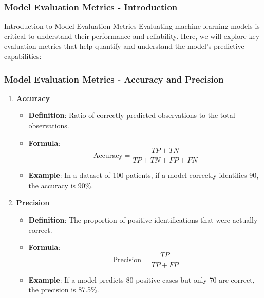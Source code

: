 \documentclass[aspectratio=169]{beamer}
\begin{document}
\begin{frame}[fragile]
    \frametitle{Model Evaluation Metrics - Introduction}
    \begin{block}{Introduction to Model Evaluation Metrics}
        Evaluating machine learning models is critical to understand their performance and reliability. 
        Here, we will explore key evaluation metrics that help quantify and understand the model's predictive capabilities:
    \end{block}
\end{frame}

\begin{frame}[fragile]
    \frametitle{Model Evaluation Metrics - Accuracy and Precision}
    \begin{enumerate}
        \item \textbf{Accuracy}
        \begin{itemize}
            \item \textbf{Definition}: Ratio of correctly predicted observations to the total observations.
            \item \textbf{Formula}:
            \begin{equation}
                \text{Accuracy} = \frac{TP + TN}{TP + TN + FP + FN}
            \end{equation}
            \item \textbf{Example}: In a dataset of 100 patients, if a model correctly identifies 90, the accuracy is 90\%.
        \end{itemize}

        \item \textbf{Precision}
        \begin{itemize}
            \item \textbf{Definition}: The proportion of positive identifications that were actually correct.
            \item \textbf{Formula}:
            \begin{equation}
                \text{Precision} = \frac{TP}{TP + FP}
            \end{equation}
            \item \textbf{Example}: If a model predicts 80 positive cases but only 70 are correct, the precision is 87.5\%.
        \end{itemize}
    \end{enumerate}
\end{frame}
\end{document}
